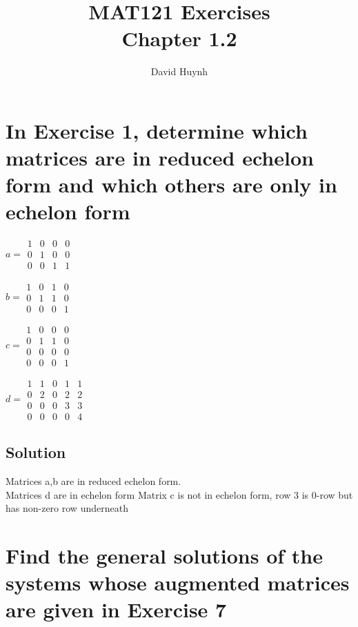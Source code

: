 \documentclass{article}
\begin{document}
\title{MAT121 Exercises\\Chapter 1.2}
\author{David Huynh}
\date{}

\maketitle

\section{In Exercise 1, determine which matrices are in reduced echelon form and which others are only in echelon form}

$a=
\begin{matrix}
1 & 0 & 0 & 0\\
0 & 1 & 0 & 0\\
0 & 0 & 1 & 1
\end{matrix}
$

$b=
\begin{matrix}
1 & 0 & 1 & 0\\
0 & 1 & 1 & 0\\
0 & 0 & 0 & 1
\end{matrix}
$

$c=
\begin{matrix}
1 & 0 & 0 & 0\\
0 & 1 & 1 & 0\\
0 & 0 & 0 & 0\\
0 & 0 & 0 & 1
\end{matrix}
$

$d=
\begin{matrix}
1 & 1 & 0 & 1 & 1\\
0 & 2 & 0 & 2 & 2\\
0 & 0 & 0 & 3 & 3\\
0 & 0 & 0 & 0 & 4
\end{matrix}
$

\subsection{Solution}

Matrices a,b are in reduced echelon form.\\
Matrices d are in echelon form
Matrix c is not in echelon form, row 3 is 0-row but has non-zero row underneath

\section{Find the general solutions of the systems whose augmented matrices are given in Exercise 7}
\end{document}
